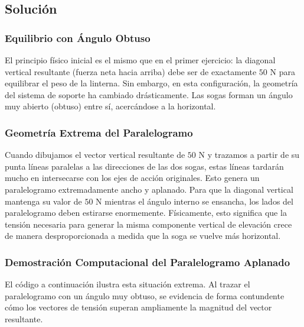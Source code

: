 \documentclass[12pt,letterpaper]{article}
\begin{document}
\subsection*{Solución}

\subsubsection*{Equilibrio con Ángulo Obtuso}
El principio físico inicial es el mismo que en el primer ejercicio: la diagonal vertical resultante (fuerza neta hacia arriba) debe ser de exactamente $50\text{ N}$ para equilibrar el peso de la linterna. Sin embargo, en esta configuración, la geometría del sistema de soporte ha cambiado drásticamente. Las sogas forman un ángulo muy abierto (obtuso) entre sí, acercándose a la horizontal.

\subsubsection*{Geometría Extrema del Paralelogramo}
Cuando dibujamos el vector vertical resultante de $50\text{ N}$ y trazamos a partir de su punta líneas paralelas a las direcciones de las dos sogas, estas líneas tardarán mucho en intersecarse con los ejes de acción originales. Esto genera un paralelogramo extremadamente ancho y aplanado. Para que la diagonal vertical mantenga su valor de $50\text{ N}$ mientras el ángulo interno se ensancha, los lados del paralelogramo deben estirarse enormemente. Físicamente, esto significa que la tensión necesaria para generar la misma componente vertical de elevación crece de manera desproporcionada a medida que la soga se vuelve más horizontal.

\subsubsection*{Demostración Computacional del Paralelogramo Aplanado}
El código a continuación ilustra esta situación extrema. Al trazar el paralelogramo con un ángulo muy obtuso, se evidencia de forma contundente cómo los vectores de tensión superan ampliamente la magnitud del vector resultante.
\end{document}
